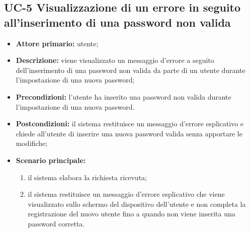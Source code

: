 \subsection{UC-5 Visualizzazione di un errore in seguito all'inserimento di una password non valida}
\begin{itemize}
	\item \textbf{Attore primario:} utente;

	\item \textbf{Descrizione:} viene visualizzato un messaggio d'errore a seguito dell'inserimento di una password non valida da parte di un utente durante l'impostazione di una nuova password;

	\item \textbf{Precondizioni:} l'utente ha inserito una password non valida durante l'impostazione di una nuova password.

	\item \textbf{Postcondizioni:} il sistema restituisce un messaggio d'errore esplicativo e chiede all'utente di inserire una nuova password valida senza apportare le modifiche;

	\item \textbf{Scenario principale:}
	      \begin{enumerate}
		      \item il sistema elabora la richiesta ricevuta;
		      \item il sistema restituisce un messaggio d'errore esplicativo che viene visualizzato sullo schermo del dispositivo dell'utente e non completa la registrazione del nuovo utente fino a quando non viene inserita una password corretta.
	      \end{enumerate}
\end{itemize}


